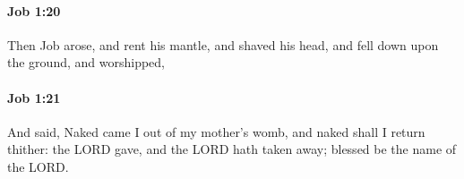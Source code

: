 		\paragraph{Job 1:20} %
			\label{JOB-1-20}

			Then Job arose, and rent his mantle, and shaved his head, and fell down upon the ground, and worshipped,


		\paragraph{Job 1:21} %
			\label{JOB-1-21}

			And said, Naked came I out of my mother’s womb, and naked shall I return thither: the LORD gave, and the LORD hath taken away; blessed be the name of the LORD.


